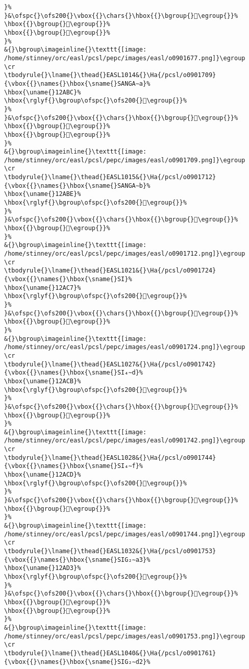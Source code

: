 \begin{verbatim}
}%
}&\ofspc{}\ofs200{}\vbox{{}\chars{}\hbox{{}\bgroup{}𒪩\egroup{}}%
\hbox{{}\bgroup{}𒪮\egroup{}}%
\hbox{{}\bgroup{}𒪲\egroup{}}%
}%
&{}\bgroup\imageinline{}\texttt{[image: /home/stinney/orc/easl/pcsl/pepc/images/easl/o0901677.png]}\egroup
\cr
\tbodyrule{}\lname{}\thead{}EASL1014&{}\Ha{/pcsl/o0901709}{\vbox{{}\names{}\hbox{\sname{}SANGA∼a}%
\hbox{\uname{}12ABC}%
\hbox{\rglyf{}\bgroup\ofspc{}\ofs200{}𒪼\egroup{}}%
}%
}&\ofspc{}\ofs200{}\vbox{{}\chars{}\hbox{{}\bgroup{}𒪺\egroup{}}%
\hbox{{}\bgroup{}𒪻\egroup{}}%
\hbox{{}\bgroup{}𒪼\egroup{}}%
}%
&{}\bgroup\imageinline{}\texttt{[image: /home/stinney/orc/easl/pcsl/pepc/images/easl/o0901709.png]}\egroup
\cr
\tbodyrule{}\lname{}\thead{}EASL1015&{}\Ha{/pcsl/o0901712}{\vbox{{}\names{}\hbox{\sname{}SANGA∼b}%
\hbox{\uname{}12ABE}%
\hbox{\rglyf{}\bgroup\ofspc{}\ofs200{}𒪾\egroup{}}%
}%
}&\ofspc{}\ofs200{}\vbox{{}\chars{}\hbox{{}\bgroup{}𒪽\egroup{}}%
\hbox{{}\bgroup{}𒪾\egroup{}}%
}%
&{}\bgroup\imageinline{}\texttt{[image: /home/stinney/orc/easl/pcsl/pepc/images/easl/o0901712.png]}\egroup
\cr
\tbodyrule{}\lname{}\thead{}EASL1021&{}\Ha{/pcsl/o0901724}{\vbox{{}\names{}\hbox{\sname{}SI}%
\hbox{\uname{}12AC7}%
\hbox{\rglyf{}\bgroup\ofspc{}\ofs200{}𒫇\egroup{}}%
}%
}&\ofspc{}\ofs200{}\vbox{{}\chars{}\hbox{{}\bgroup{}𒫄\egroup{}}%
\hbox{{}\bgroup{}𒫇\egroup{}}%
}%
&{}\bgroup\imageinline{}\texttt{[image: /home/stinney/orc/easl/pcsl/pepc/images/easl/o0901724.png]}\egroup
\cr
\tbodyrule{}\lname{}\thead{}EASL1027&{}\Ha{/pcsl/o0901742}{\vbox{{}\names{}\hbox{\sname{}SI₄∼d}%
\hbox{\uname{}12ACB}%
\hbox{\rglyf{}\bgroup\ofspc{}\ofs200{}𒫋\egroup{}}%
}%
}&\ofspc{}\ofs200{}\vbox{{}\chars{}\hbox{{}\bgroup{}𒫋\egroup{}}%
\hbox{{}\bgroup{}𒫌\egroup{}}%
}%
&{}\bgroup\imageinline{}\texttt{[image: /home/stinney/orc/easl/pcsl/pepc/images/easl/o0901742.png]}\egroup
\cr
\tbodyrule{}\lname{}\thead{}EASL1028&{}\Ha{/pcsl/o0901744}{\vbox{{}\names{}\hbox{\sname{}SI₄∼f}%
\hbox{\uname{}12ACD}%
\hbox{\rglyf{}\bgroup\ofspc{}\ofs200{}𒫍\egroup{}}%
}%
}&\ofspc{}\ofs200{}\vbox{{}\chars{}\hbox{{}\bgroup{}𒫍\egroup{}}%
\hbox{{}\bgroup{}𒫎\egroup{}}%
}%
&{}\bgroup\imageinline{}\texttt{[image: /home/stinney/orc/easl/pcsl/pepc/images/easl/o0901744.png]}\egroup
\cr
\tbodyrule{}\lname{}\thead{}EASL1032&{}\Ha{/pcsl/o0901753}{\vbox{{}\names{}\hbox{\sname{}SIG₂∼a3}%
\hbox{\uname{}12AD3}%
\hbox{\rglyf{}\bgroup\ofspc{}\ofs200{}𒫓\egroup{}}%
}%
}&\ofspc{}\ofs200{}\vbox{{}\chars{}\hbox{{}\bgroup{}𒫓\egroup{}}%
\hbox{{}\bgroup{}𒫔\egroup{}}%
\hbox{{}\bgroup{}𒫕\egroup{}}%
}%
&{}\bgroup\imageinline{}\texttt{[image: /home/stinney/orc/easl/pcsl/pepc/images/easl/o0901753.png]}\egroup
\cr
\tbodyrule{}\lname{}\thead{}EASL1040&{}\Ha{/pcsl/o0901761}{\vbox{{}\names{}\hbox{\sname{}SIG₂∼d2}%

\end{verbatim}
